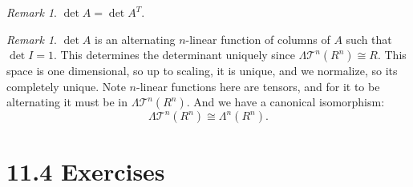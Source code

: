 \documentclass[9pt,reqno,twoside]{amsbook}
\theoremstyle{plain}
\numberwithin{section}{chapter}
\numberwithin{equation}{chapter}
\theoremstyle{definition}
\theoremstyle{remark}
\newtheorem{rem}[theorem]{Remark}
\theoremstyle{plain}
\newcommand{\mc}{\mathcal}
\newcommand{\Tau}{\mc{T}}
\begin{document}
\begin{rem}
$\det A = \det A^T$. 
\end{rem}

\begin{rem}
$\det A$ is an alternating $n$-linear function of columns of $A$ such that $\det I = 1$. This determines the determinant uniquely since $\Lambda\Tau^n(R^n) \cong R$. This space is one dimensional, so up to scaling, it is unique, and we normalize, so its completely unique. Note $n$-linear functions here are tensors, and for it to be alternating it must be in $\Lambda\Tau^n(R^n)$. And we have a canonical isomorphism:
$$
\Lambda\Tau^n(R^n) \cong \Lambda^n(R^n).
$$
\end{rem}

\section*{11.4 Exercises}
\end{document}
